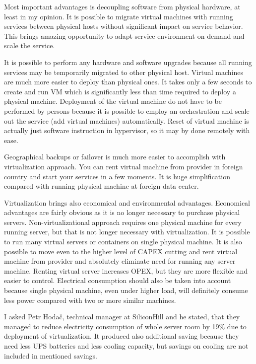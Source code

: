 
Most important advantages is decoupling software from physical hardware, at least in my opinion. It is possible to migrate virtual machines with running services between physical hosts without significant impact on service behavior. This brings amazing opportunity to adapt service environment on demand and scale the service.

It is possible to perform any hardware and software upgrades because all running services may be temporarily migrated to other physical host. Virtual machines are much more easier to deploy than physical ones. It takes only a few seconds to create and run \Ac{VM} which is significantly less than time required to deploy a physical machine. Deployment of the virtual machine do not have to be performed by persons because it is possible to employ an orchestration and scale out the service (add virtual machines) automatically.
Reset of virtual machine is actually just software instruction in hypervisor, so it may by done remotely with ease.

Geographical backups or failover is much more easier to accomplish with virtualization approach. You can rent virtual machine from provider in foreign country and start your services in a few moments. It is huge simplification compared with running physical machine at foreign data center.

Virtualization brings also economical and environmental advantages. Economical advantages are fairly obvious as it is no longer necessary to purchase physical servers. Non-virtualizational approach requires one physical machine for every running server, but that is not longer necessary with virtualization. It is possible to run many virtual servers or containers on single physical machine. It is also possible to move even to the higher level of \Ac{CAPEX} cutting and rent virtual machine from provider and absolutely eliminate need for running any server machine. Renting virtual server increases \Ac{OPEX}, but they are more flexible and easier to control.
Electrical consumption should also be taken into account because single physical machine, even under higher load, will definitely consume less power compared with two or more similar machines. 

I asked Petr Hodač, technical manager at SiliconHill and he stated, that they managed to reduce electricity consumption of whole server room by 19\%  due to deployment of virtualization. It produced also additional saving because they need less \Ac{UPS} batteries and less cooling capacity, but savings on cooling are not included in mentioned savings.

